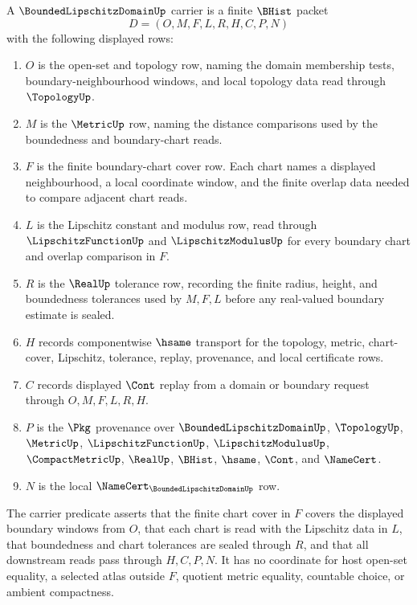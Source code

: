 \begin{definition}
\label{def:bounded-lipschitz-domain-carrier}
A $\BoundedLipschitzDomainUp$ carrier is a finite $\BHist$ packet
$$
D=(O,M,F,L,R,H,C,P,N)
$$
with the following displayed rows:
\begin{enumerate}
\item $O$ is the open-set and topology row, naming the domain membership tests, boundary-neighbourhood windows, and local topology data read through $\TopologyUp$.
\item $M$ is the $\MetricUp$ row, naming the distance comparisons used by the boundedness and boundary-chart reads.
\item $F$ is the finite boundary-chart cover row. Each chart names a displayed neighbourhood, a local coordinate window, and the finite overlap data needed to compare adjacent chart reads.
\item $L$ is the Lipschitz constant and modulus row, read through $\LipschitzFunctionUp$ and $\LipschitzModulusUp$ for every boundary chart and overlap comparison in $F$.
\item $R$ is the $\RealUp$ tolerance row, recording the finite radius, height, and boundedness tolerances used by $M,F,L$ before any real-valued boundary estimate is sealed.
\item $H$ records componentwise $\hsame$ transport for the topology, metric, chart-cover, Lipschitz, tolerance, replay, provenance, and local certificate rows.
\item $C$ records displayed $\Cont$ replay from a domain or boundary request through $O,M,F,L,R,H$.
\item $P$ is the $\Pkg$ provenance over $\BoundedLipschitzDomainUp$, $\TopologyUp$, $\MetricUp$, $\LipschitzFunctionUp$, $\LipschitzModulusUp$, $\CompactMetricUp$, $\RealUp$, $\BHist$, $\hsame$, $\Cont$, and $\NameCert$.
\item $N$ is the local $\NameCert_{\BoundedLipschitzDomainUp}$ row.
\end{enumerate}
The carrier predicate asserts that the finite chart cover in $F$ covers the displayed boundary windows from $O$, that each chart is read with the Lipschitz data in $L$, that boundedness and chart tolerances are sealed through $R$, and that all downstream reads pass through $H,C,P,N$. It has no coordinate for host open-set equality, a selected atlas outside $F$, quotient metric equality, countable choice, or ambient compactness.
\end{definition}

